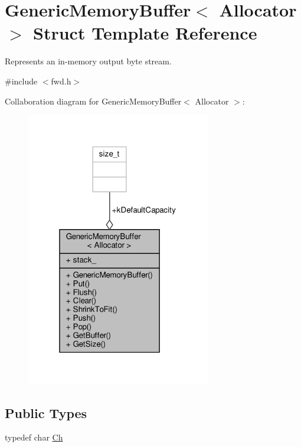 \hypertarget{structGenericMemoryBuffer}{}\section{Generic\+Memory\+Buffer$<$ Allocator $>$ Struct Template Reference}
\label{structGenericMemoryBuffer}


Represents an in-\/memory output byte stream.  




{\ttfamily \#include $<$fwd.\+h$>$}



Collaboration diagram for Generic\+Memory\+Buffer$<$ Allocator $>$\+:
\nopagebreak
\begin{figure}[H]
\begin{center}
\leavevmode
\includegraphics[width=229pt]{structGenericMemoryBuffer__coll__graph}
\end{center}
\end{figure}
\subsection*{Public Types}
\begin{DoxyCompactItemize}
\item 
typedef char \hyperlink{structGenericMemoryBuffer_a212f137abfd8bce2ad216b2d960c027f}{Ch}
\end{DoxyCompactItemize}
